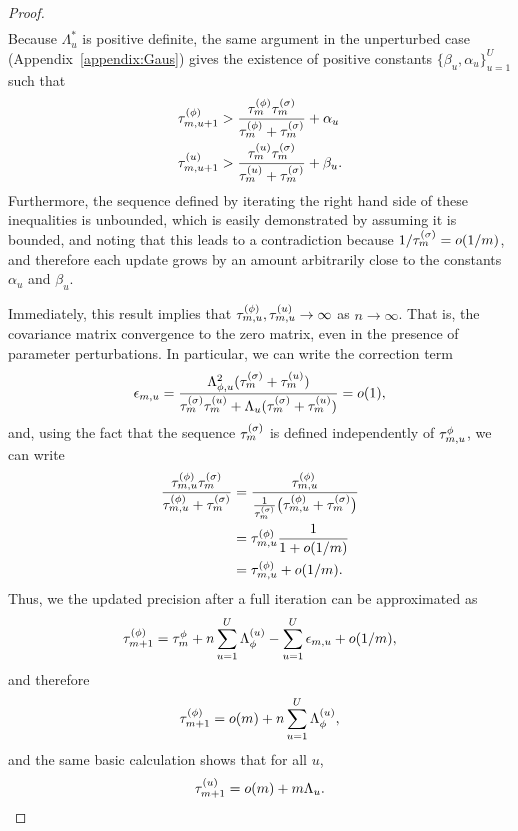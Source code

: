 \begin{proof}
\begin{align*}
   \end{align*}
  Because $\Lambda^*_u$ is positive definite, the same argument in the unperturbed case (Appendix~\ref{appendix:Gaus}) gives the existence of positive constants $\{\beta_u, \alpha_u\}_{u = 1}^U$ such that
  \begin{align*}
    \tau^{(\phi)}_{m, u+1} &> \frac{\tau^{(\phi)}_m\tau^{(\sigma)}_m}{\tau^{(\phi)}_m + \tau^{(\sigma)}_m} + \alpha_u \\
    \tau^{(u)}_{m, u+1} &> \frac{\tau^{(u)}_m\tau^{(\sigma)}_m}{\tau^{(u)}_m + \tau^{(\sigma)}_m} + \beta_u.
  \end{align*}
  Furthermore, the sequence defined by iterating the right hand side of these inequalities is unbounded, which is easily demonstrated by assuming it is bounded, and noting that this leads to a contradiction because $1/\tau^{(\sigma)}_m = o(1/m)$, and therefore each update grows by an amount arbitrarily close to the constants $\alpha_u$ and $\beta_u$.
  
  Immediately, this result implies that $\tau_{m, u}^{(\phi)}, \tau_{m, u}^{(u)} \rightarrow \infty$ as $n \rightarrow \infty$. 
  That is, the covariance matrix convergence to the zero matrix, even in the presence of parameter perturbations. 
  In particular, we can write the correction term
  $$
  \epsilon_{m, u} = \frac{\Lambda^2_{\phi, u}(\tau^{(\sigma)}_m + \tau^{(u)}_m)}{\tau^{(\sigma)}_m\tau^{(u)}_m + \Lambda_u(\tau^{(\sigma)}_m + \tau^{(u)}_m)} = o(1),
  $$
  and, using the fact that the sequence $\tau^{(\sigma)}_m$ is defined independently of $\tau^{\phi}_{m, u}$, we can write 
  \begin{align*}
  \frac{\tau^{(\phi)}_{m, u}\tau^{(\sigma)}_m}{\tau^{(\phi)}_{m, u} + \tau^{(\sigma)}_m} &= \frac{\tau^{(\phi)}_{m, u}}{\frac{1}{\tau^{(\sigma)}_{m}}\big(\tau^{(\phi)}_{m, u} + \tau^{(\sigma)}_{m}\big)} \\
  &= \tau_{m, u}^{(\phi)}\frac{1}{1+o(1/m)} \\
  &= \tau^{(\phi)}_{m, u} + o(1/m).
  \end{align*}
  Thus, we the updated precision after a full iteration can be approximated as
  $$
  \tau_{m + 1}^{(\phi)} = \tau^{\phi}_{m} + n\sum_{u = 1}^U \Lambda_{\phi}^{(u)} - \sum_{u = 1}^U\epsilon_{m, u} + o(1/m),
  $$
  and therefore 
  $$
  \tau_{m + 1}^{(\phi)} = o(m) + n\sum_{u = 1}^U \Lambda_{\phi}^{(u)}, 
  $$
  and the same basic calculation shows that for all $u$, 
  $$
  \tau^{(u)}_{m+1} = o(m) + m\Lambda_{u}.
  $$
  

\end{proof}
